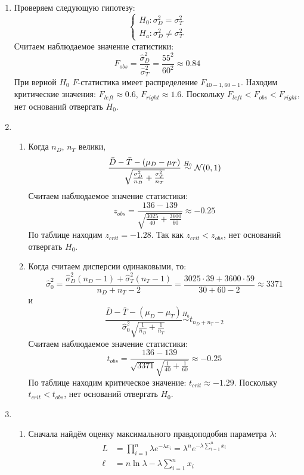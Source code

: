 \begin{enumerate}
\item Проверяем следующую гипотезу:
\[
\begin{cases}
H_0: \sigma^2_D = \sigma^2_T \\
H_a: \sigma^2_D \neq \sigma^2_T
\end{cases}
\]
Считаем наблюдаемое значение статистики:
\[
F_{obs} = \frac{\hat{\sigma}^2_D}{\hat{\sigma}^2_T} = \frac{55^2}{60^2} \approx 0.84
\]
При верной $H_0$ $F$-статистика имеет распределение $F_{40-1, 60-1}$.
Находим критические значения: $F_{left} \approx 0.6$, $F_{right} \approx 1.6$.
Поскольку $F_{left} < F_{obs} < F_{right}$, нет оснований отвергать $H_0$.
\item
\begin{enumerate}
Проверяем гипотезу
\[
\begin{cases}
H_0: \mu_{D} = \mu_{T} \\
H_a: \mu_{D} < \mu_{T}
\end{cases}
\]
\item Когда $n_D$, $n_T$ велики,
\[
\frac{\bar D - \bar T - (\mu_D - \mu_T)}{\sqrt{\frac{\sigma^2_D}{n_D} + \frac{\sigma^2_T}{n_T}}} \stackrel{H_0}{\sim} \mathcal{N}(0, 1)
\]
Считаем наблюдаемое значение статистики:
\[
z_{obs} = \frac{136 - 139}{\sqrt{\frac{3025}{40} + \frac{3600}{60}}} \approx -0.25
\]
По таблице находим $z_{crit} = -1.28$.
Так как $z_{crit} < z_{obs}$, нет оснований отвергать $H_0$.
\item Когда считаем дисперсии одинаковыми, то:
\[
\hat{\sigma}^2_0 = \frac{\hat{\sigma}^2_D (n_D - 1) + \hat{\sigma}^2_T (n_T - 1)}{n_D + n_T - 2} = \frac{3025 \cdot 39 + 3600 \cdot 59}{30 + 60 - 2} \approx 3371
\]
и
\[
\frac{\bar D - \bar T - (\mu_D - \mu_T)}{\hat{\sigma}^2_0\sqrt{\frac{1}{n_D} + \frac{1}{n_T}}} \stackrel{H_0}{\sim} t_{n_D + n_T - 2}
\]
Считаем наблюдаемое значение статистики:
\[
t_{obs} = \frac{136 - 139}{\sqrt{3371}\sqrt{\frac{1}{40} + \frac{1}{60}}} \approx -0.25
\]
По таблице находим критическое значение: $t_{crit} \approx -1.29$.
Поскольку $t_{crit} < t_{obs}$, нет оснований отвергать $H_0$.
\end{enumerate}
\item
\begin{enumerate}
\item Сначала найдём оценку максимального правдоподобия параметра $\lambda$:
\begin{align*}
L &= \prod_{i=1}^n \lambda e^{-\lambda x_i} = \lambda^n e^{-\lambda \sum_{i=1}^n x_i} \\
\ell &= n \ln \lambda - \lambda \sum_{i=1}^n x_i \\

\end{align*}
\end{enumerate}
\end{enumerate}
